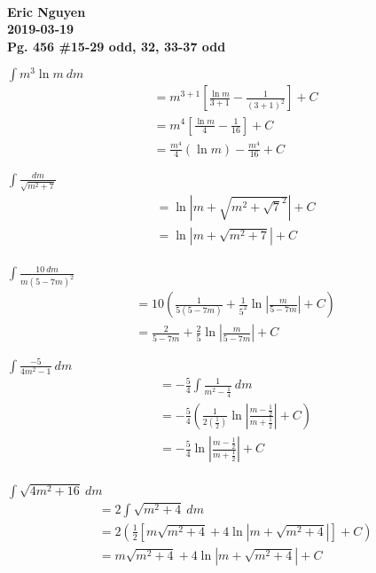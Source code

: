 \documentclass[12pt]{article}
\newenvironment{problem}[2][]{
    \begin{trivlist}
        \item[
            {\bfseries #1}
            {\bfseries #2.}
        ]
}{\end{trivlist}}
\newcommand{\assignment}{Pg. 456 \#15-29 odd, 32, 33-37 odd}
\newcommand{\name}{Eric Nguyen}
\newcommand{\duedate}{2019-03-19}
\newcommand{\details}{\textbf{\\\name \\\duedate \\\assignment}}
\begin{document}
\details

\begin{problem}{15}
$\displaystyle\int m^3 \ln m ~ dm$
\begin{align}
&= m^{3 + 1} \left[\frac{\ln m}{3 + 1} - \frac{1}{\left(3 + 1\right)^2}\right] + C \\
&= m^4 \left[\frac{\ln m}{4} - \frac{1}{16}\right] + C \\
&= \frac{m^4}{4} \left(\ln m\right) - \frac{m^4}{16} + C
\end{align}
\end{problem}

\begin{problem}{17}
$\displaystyle\int \frac{dm}{\sqrt{m^2 + 7}}$
\begin{align}
&= \ln \left|m + \sqrt{m^2 + \sqrt{7}^2}\right| + C \\
&= \ln \left|m + \sqrt{m^2 + 7}\right| + C \\
\end{align}
\end{problem}

\begin{problem}{19}
$\displaystyle\int \frac{10 ~ dm}{m\left(5 - 7m\right)^2}$
\begin{align}
&= 10 \left(\frac{1}{5 \left(5 - 7m\right)} + \frac{1}{5^2} \ln \left|\frac{m}{5 - 7m}\right| + C\right) \\
&= \frac{2}{5 - 7m} + \frac{2}{5} \ln \left|\frac{m}{5 - 7m}\right| + C
\end{align}
\end{problem}

\begin{problem}{21}
$\displaystyle\int \frac{-5}{4m^2 - 1} ~ dm$
\begin{align}
&= -\frac{5}{4} \int \frac{1}{m^2 - \frac{1}{4}} ~ dm \\
&= -\frac{5}{4}\left(\frac{1}{2\left(\frac{1}{2}\right)} \ln\left|\frac{m - \frac{1}{2}}{m + \frac{1}{2}}\right| + C\right) \\
&= -\frac{5}{4} \ln\left|\frac{m - \frac{1}{2}}{m + \frac{1}{2}}\right| + C \\
\end{align}
\end{problem}

\begin{problem}{23}
$\displaystyle\int \sqrt{4m^2 + 16} ~ dm$
\begin{align}
&= 2 \int \sqrt{m^2 + 4} ~ dm \\
&= 2 \left(\frac{1}{2}\left[m\sqrt{m^2 + 4} + 4 \ln \left|m + \sqrt{m^2 + 4}\right|\right] + C\right) \\
&= m\sqrt{m^2 + 4} + 4 \ln \left|m + \sqrt{m^2 + 4}\right| + C
\end{align}
\end{problem}
\end{document}
